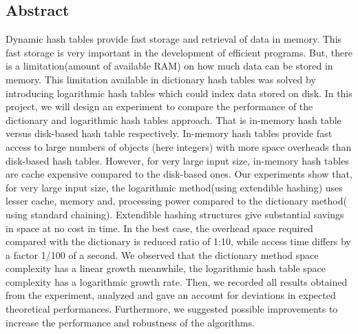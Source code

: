 \documentclass[a4paper,12pt, openany]{book}
\let\listoftableandfigures\listoftables
\begin{document}

\newpage
\vspace*{0.25\textheight}
\begin{center}
	\section*{Abstract}
	\vspace{.2in}
\end{center}
	Dynamic hash tables provide fast storage and retrieval of data in memory. This fast storage is very important in the development of efficient programs. But, there is a limitation(amount of available RAM) on how much data can be stored in memory. This limitation available in dictionary hash tables was solved by introducing logarithmic hash tables which could index data stored on disk. In this project, we will design an experiment to compare the performance of the dictionary and logarithmic hash tables approach. That is in-memory hash table versus disk-based hash table respectively. In-memory hash tables provide fast access to large numbers of objects (here integers) with more space overheads than disk-based hash tables. However, for very large input size, in-memory hash tables are cache expensive compared to the disk-based ones.  Our experiments show that, for very large input size, the logarithmic method(using extendible hashing) uses lesser cache, memory and, processing power compared to the dictionary method( using standard chaining). Extendible hashing structures give substantial savings in space at no cost in time. In the best case, the overhead space required compared with the dictionary is reduced ratio of 1:10, while access time differs by a factor 1/100 of a second. We observed that the dictionary method space complexity has a linear growth meanwhile, the logarithmic hash table space complexity has a logarithmic growth rate. Then, we recorded all results obtained from the experiment, analyzed and gave an account for deviations in expected theoretical performances. Furthermore, we suggested possible improvements to increase the performance and robustness of the algorithms.  
 

\tableofcontents
\begin{doublespace}
	\listoftableandfigures
\end{doublespace}


\cfoot{\thepage}
\pagestyle{fancy} 
\end{document}
